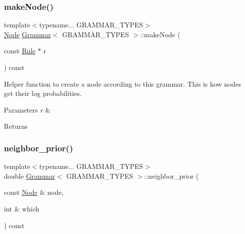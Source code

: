\subsubsection{\texorpdfstring{make\+Node()}{makeNode()}}
{\footnotesize\ttfamily template$<$typename... G\+R\+A\+M\+M\+A\+R\+\_\+\+T\+Y\+P\+ES$>$ \\
\hyperlink{class_node}{Node} \hyperlink{class_grammar}{Grammar}$<$ G\+R\+A\+M\+M\+A\+R\+\_\+\+T\+Y\+P\+ES $>$\+::make\+Node (\begin{DoxyParamCaption}\item[{const \hyperlink{class_rule}{Rule} $\ast$}]{r }\end{DoxyParamCaption}) const\hspace{0.3cm}{\ttfamily [inline]}}

Helper function to create a node according to this grammar. This is how nodes get their log probabilities. 
\begin{DoxyParams}{Parameters}
{\em r} & \\
\hline
\end{DoxyParams}
\begin{DoxyReturn}{Returns}

\end{DoxyReturn}
\mbox{\label{class_grammar_a36e6e5072b99611de47c4be3ab78761c}} 
\subsubsection{\texorpdfstring{neighbor\+\_\+prior()}{neighbor\_prior()}}
{\footnotesize\ttfamily template$<$typename... G\+R\+A\+M\+M\+A\+R\+\_\+\+T\+Y\+P\+ES$>$ \\
double \hyperlink{class_grammar}{Grammar}$<$ G\+R\+A\+M\+M\+A\+R\+\_\+\+T\+Y\+P\+ES $>$\+::neighbor\+\_\+prior (\begin{DoxyParamCaption}\item[{const \hyperlink{class_node}{Node} \&}]{node,  }\item[{int \&}]{which }\end{DoxyParamCaption}) const\hspace{0.3cm}{\ttfamily [inline]}}

\mbox{\label{class_grammar_a486cec3b8e6c757eb348031ff8118a99}} 
